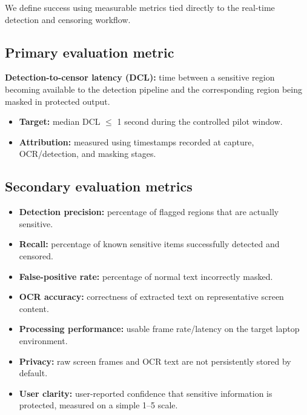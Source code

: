 \documentclass[12pt,a4paper]{article}
\begin{document}
We define success using measurable metrics tied directly to the real-time detection and censoring workflow.

\subsection{Primary evaluation metric}

\textbf{Detection-to-censor latency (DCL):} time between a sensitive region becoming available to the detection pipeline and the corresponding region being masked in protected output.

\begin{itemize}
    \item \textbf{Target:} median DCL $\leq$ 1 second during the controlled pilot window.

    \item \textbf{Attribution:} measured using timestamps recorded at capture, OCR/detection, and masking stages.
\end{itemize}

\subsection{Secondary evaluation metrics}

\begin{itemize}
    \item \textbf{Detection precision:} percentage of flagged regions that are actually sensitive.

    \item \textbf{Recall:} percentage of known sensitive items successfully detected and censored.

    \item \textbf{False-positive rate:} percentage of normal text incorrectly masked.

    \item \textbf{OCR accuracy:} correctness of extracted text on representative screen content.

    \item \textbf{Processing performance:} usable frame rate/latency on the target laptop environment.

    \item \textbf{Privacy:} raw screen frames and OCR text are not persistently stored by default.

    \item \textbf{User clarity:} user-reported confidence that sensitive information is protected, measured on a simple 1--5 scale.
\end{itemize}
\end{document}
